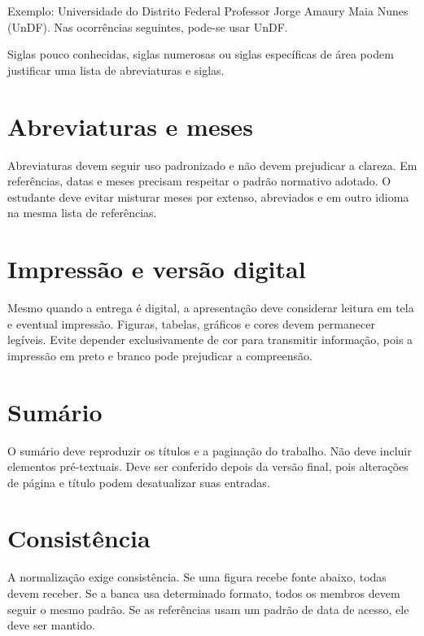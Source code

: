 Exemplo: Universidade do Distrito Federal Professor Jorge Amaury Maia Nunes (UnDF). Nas ocorrências seguintes, pode-se usar UnDF.

Siglas pouco conhecidas, siglas numerosas ou siglas específicas de área podem justificar uma lista de abreviaturas e siglas.

\section{Abreviaturas e meses}

Abreviaturas devem seguir uso padronizado e não devem prejudicar a clareza. Em referências, datas e meses precisam respeitar o padrão normativo adotado. O estudante deve evitar misturar meses por extenso, abreviados e em outro idioma na mesma lista de referências.

\section{Impressão e versão digital}

Mesmo quando a entrega é digital, a apresentação deve considerar leitura em tela e eventual impressão. Figuras, tabelas, gráficos e cores devem permanecer legíveis. Evite depender exclusivamente de cor para transmitir informação, pois a impressão em preto e branco pode prejudicar a compreensão.

\section{Sumário}

O sumário deve reproduzir os títulos e a paginação do trabalho. Não deve incluir elementos pré-textuais. Deve ser conferido depois da versão final, pois alterações de página e título podem desatualizar suas entradas.

\section{Consistência}

A normalização exige consistência. Se uma figura recebe fonte abaixo, todas devem receber. Se a banca usa determinado formato, todos os membros devem seguir o mesmo padrão. Se as referências usam um padrão de data de acesso, ele deve ser mantido.


